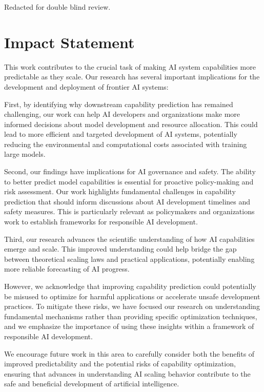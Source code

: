 \documentclass{article}
\begin{document}
Redacted for double blind review.

\section*{Impact Statement}

This work contributes to the crucial task of making AI system capabilities more predictable as they scale. Our research has several important implications for the development and deployment of frontier AI systems:

First, by identifying why downstream capability prediction has remained challenging, our work can help AI developers and organizations make more informed decisions about model development and resource allocation. This could lead to more efficient and targeted development of AI systems, potentially reducing the environmental and computational costs associated with training large models.

Second, our findings have implications for AI governance and safety. The ability to better predict model capabilities is essential for proactive policy-making and risk assessment. Our work highlights fundamental challenges in capability prediction that should inform discussions about AI development timelines and safety measures. This is particularly relevant as policymakers and organizations work to establish frameworks for responsible AI development.

Third, our research advances the scientific understanding of how AI capabilities emerge and scale. This improved understanding could help bridge the gap between theoretical scaling laws and practical applications, potentially enabling more reliable forecasting of AI progress.

However, we acknowledge that improving capability prediction could potentially be misused to optimize for harmful applications or accelerate unsafe development practices. To mitigate these risks, we have focused our research on understanding fundamental mechanisms rather than providing specific optimization techniques, and we emphasize the importance of using these insights within a framework of responsible AI development.

We encourage future work in this area to carefully consider both the benefits of improved predictability and the potential risks of capability optimization, ensuring that advances in understanding AI scaling behavior contribute to the safe and beneficial development of artificial intelligence.

\clearpage

\nocite{caballero2023broken}






\clearpage

\end{document}
